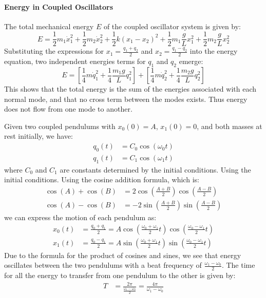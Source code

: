 \documentclass[11pt]{report}
\begin{document}
\paragraph{Energy in Coupled Oscillators} The total mechanical energy \( E \) of the coupled oscillator system is given by:
\begin{equation}\label{eq:coupled_energy}
    E = \frac{1}{2}m_1\dot{x}_1^2 + \frac{1}{2}m_2\dot{x}_2^2 + \frac{1}{2}k(x_1 - x_2)^2 + \frac{1}{2}m_1\frac{g}{L}x_1^2 + \frac{1}{2}m_2\frac{g}{L}x_2^2
\end{equation}
Substituting the expressions for \( x_1 = \frac{q_1 + q_2}{2} \) and \( x_2 = \frac{q_1 - q_2}{2} \) into the energy equation, two independent energies terms for $q_1$ and $q_2$ emerge:
\begin{equation}\label{eq:mode_energy}
    E = \left[ \frac{1}{4} m \dot{q}_1^2 + \frac{1}{4}\frac{m_1 g}{L} q_1^2 \right] + \left[ \frac{1}{4} m \dot{q}_2^2 + \frac{1}{4}\frac{m_2 g}{L} q_2^2 \right]
\end{equation}
This shows that the total energy is the sum of the energies associated with each normal mode, and that no cross term between the modes exists. Thus energy does not flow from one mode to another.

\begin{example}
    Given two coupled pendulums with $x_0(0) = A$, $x_1(0) = 0$, and both masses at rest initially, we have:
    \begin{align*}
        q_0(t) &= C_0 \cos(\omega_0 t) \\
        q_1(t) &= C_1 \cos(\omega_1 t)
    \end{align*}
    where \( C_0 \) and \( C_1 \) are constants determined by the initial conditions. Using the initial conditions. Using the cosine addition formula, which is:
    \begin{align*}
        \cos(A) + \cos(B) &= 2\cos\left(\frac{A+B}{2}\right)\cos\left(\frac{A-B}{2}\right) \\
        \cos(A) - \cos(B) &= -2\sin\left(\frac{A+B}{2}\right)\sin\left(\frac{A-B}{2}\right)
    \end{align*}
    we can express the motion of each pendulum as:
    \begin{align*}
        x_0(t) &= \frac{q_0 + q_1}{2} = A \cos\left(\frac{\omega_0 + \omega_1}{2} t\right) \cos\left(\frac{\omega_0 - \omega_1}{2} t\right) \\
        x_1(t) &= \frac{q_0 - q_1}{2} = A \sin\left(\frac{\omega_0 + \omega_1}{2} t\right) \sin\left(\frac{\omega_0 - \omega_1}{2} t\right)
    \end{align*}
    Due to the formula for the product of cosines and sines, we see that energy oscillates between the two pendulums with a beat frequency of \( \frac{\omega_1 - \omega_0}{2} \). The time for all the energy to transfer from one pendulum to the other is given by:
    \begin{align*}
        T &= \frac{2\pi}{\frac{\omega_1 - \omega_0}{2}} = \frac{4\pi}{\omega_1 - \omega_0}
    \end{align*}

\end{example}
\end{document}
